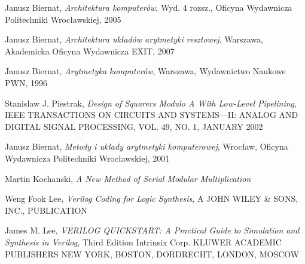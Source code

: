 \documentclass[a4paper]{article}
\begin{document}
\begin{thebibliography}{9}
Janusz Biernat, \emph{Architektura komputerów}, Wyd. 4 rozsz., Oficyna Wydawnicza Politechniki Wrocławskiej, 2005

 \label{ArchUklReszt}
Janusz Biernat, \emph{Architektura układów arytmetyki resztowej}, Warszawa, Akademicka Oficyna Wydawnicza EXIT, 2007

Janusz Biernat, \emph{Arytmetyka komputerów}, Warszawa, Wydawnictwo Naukowe PWN, 1996

 \label{sqrDes}
Stanislaw J. Piestrak, \emph{Design of Squarers Modulo A With Low-Level Pipelining}, IEEE TRANSACTIONS ON CIRCUITS AND SYSTEMS—II: ANALOG AND DIGITAL SIGNAL PROCESSING, VOL. 49, NO. 1, JANUARY 2002

Janusz Biernat, \emph{Metody i układy arytmetyki komputerowej}, Wrocław, Oficyna Wydawnicza Politechniki Wrocławskiej, 2001

 \label{kochanski}
Martin Kochanski, \emph{A New Method of Serial Modular Multiplication}

Weng Fook Lee, \emph{Verilog Coding for Logic Synthesis}, A JOHN WILEY \& SONS, INC., PUBLICATION

James M. Lee, \emph{VERILOG QUICKSTART: A Practical Guide to Simulation and Synthesis in Verilog}, Third Edition Intrinsix Corp. KLUWER ACADEMIC PUBLISHERS NEW YORK, BOSTON, DORDRECHT, LONDON, MOSCOW

\end{thebibliography}
\end{document}
